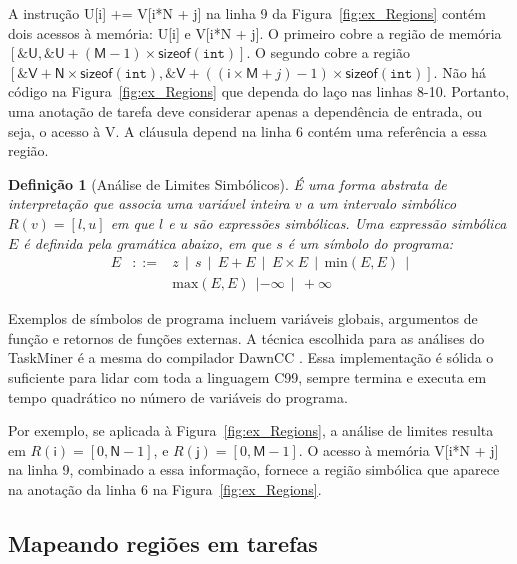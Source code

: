 \documentclass[sigplan,10pt]{acmart}
\newcommand\dawn{\mbox{\textsf{DawnCC}}}
\newcommand\Taskminer{\mbox{\textsf{TaskMiner}}}
\newtheorem{Definicao}{Defini\c{c}\~{a}o}
\begin{document}
A instrução \textsf{U[i] += V[i*N + j]} na linha 9 da Figura~\ref{fig:ex_Regions}
contém dois acessos à memória: \textsf{U[i]} e
\textsf{V[i*N + j]}.
 O primeiro cobre a região de memória $[\mathtt{\&}\mathsf{U},
\mathtt{\&}\mathsf{U} + (\mathsf{M} - 1) \times \mathsf{sizeof}(\mathtt{int})]$.
O segundo cobre a região 
$[\mathtt{\&}\mathsf{V} + \mathsf{N} \times \mathsf{sizeof}(\mathtt{int}), \mathtt{\&}\mathsf{V} + ((\mathsf{i} \times \mathsf{M} + j) - 1) \times \mathsf{sizeof}(\mathtt{int})]$.
Não há código na Figura~\ref{fig:ex_Regions} que dependa do laço nas linhas 8-10.
Portanto, uma anotação de tarefa deve considerar apenas a dependência de entrada, ou seja,
o acesso à \textsf{V}. A cláusula \textsf{depend} na linha 6 contém uma referência
a essa região.

\begin{Definicao} [Análise de Limites Simbólicos]
\label{def:limites}
É uma forma abstrata de interpretação que associa uma variável inteira $v$
a um intervalo simbólico $R(v) = [l, u]$ em que $l$ e $u$ são expressões simbólicas.
Uma expressão simbólica $E$ é definida pela gramática abaixo, em que $s$ é um 
símbolo do programa:
\renewcommand{\arraystretch}{0.9}
\[
\begin{array}{rcl}
E & ::= & z \ \ | \ \ s \ \ | \ \ E + E \ \ | \ \ E \times E \ \ | \ \  \mbox{min}(E, E) \ \ | \\
&  & \mbox{max}(E, E) \ \ | -\infty \ \ | \ \ +\infty
\end{array}
\]
\end{Definicao}

Exemplos de símbolos de programa incluem variáveis globais, argumentos de função e retornos de
funções externas. A técnica
escolhida para as análises do {\Taskminer} é a mesma do compilador \dawn{} \cite{Mendonca17}.
Essa implementação é sólida o suficiente para lidar com toda a linguagem C99, sempre termina
e executa em tempo quadrático no número de variáveis do programa.

Por exemplo, se aplicada à Figura~\ref{fig:ex_Regions}, a análise de limites resulta em 
$R(\mathsf{i}) = [0, \mathsf{N} - 1]$, e $R(\mathsf{j}) = [0, \mathsf{M} - 1]$.
O acesso à memória \textsf{V[i*N + j]} na linha 9, combinado a essa informação, fornece
a região simbólica que aparece na anotação da linha 6 na Figura~\ref{fig:ex_Regions}.

\subsection{Mapeando regiões em tarefas}
\label{sub:identification}
\end{document}
